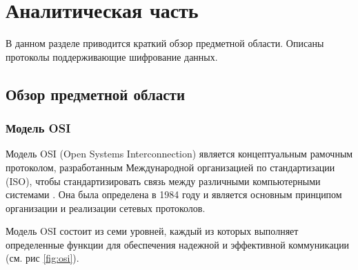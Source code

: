 \section{Аналитическая часть}

В данном разделе приводится краткий обзор предметной области. Описаны протоколы поддерживающие шифрование данных.


\subsection{Обзор предметной области}

\subsubsection{Модель OSI}

Модель OSI (Open Systems Interconnection) является концептуальным рамочным протоколом, разработанным Международной организацией по стандартизации (ISO), чтобы стандартизировать связь между различными компьютерными системами \cite{osi}. Она была определена в 1984 году и является основным принципом организации и реализации сетевых протоколов.

Модель OSI состоит из семи уровней, каждый из которых выполняет определенные функции для обеспечения надежной и эффективной коммуникации (см. рис \ref{fig:osi}).

